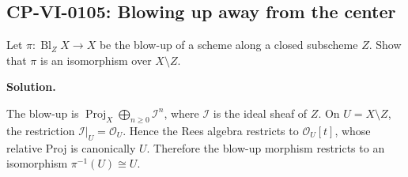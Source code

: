 
\subsection*{CP-VI-0105: Blowing up away from the center}

Let $\pi:\operatorname{Bl}_Z X\to X$ be the blow-up of a scheme along a closed subscheme $Z$. Show that $\pi$ is an isomorphism over $X\setminus Z$.

\medskip
\noindent\textbf{Solution.}

The blow-up is $\operatorname{Proj}_X\bigoplus_{n\ge0}\mathcal I^n$, where $\mathcal I$ is the ideal sheaf of $Z$. On $U=X\setminus Z$, the restriction $\mathcal I|_U=\mathcal O_U$. Hence the Rees algebra restricts to $\mathcal O_U[t]$, whose relative Proj is canonically $U$. Therefore the blow-up morphism restricts to an isomorphism $\pi^{-1}(U)\cong U$.
